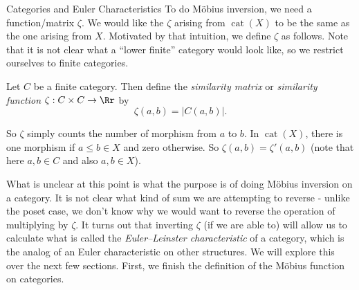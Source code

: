 \documentclass[12pt]{pom_thesis}
\DeclareMathOperator{\cat}{cat}
\begin{document}
\begin{chapter}{Categories and Euler Characteristics}
To do M\"obius inversion, we need a function/matrix $\zeta$. We would like the $\zeta$ arising from $\cat(X)$ to be the same as the one arising from $X$. Motivated by that intuition, we define $\zeta$ as follows. Note that it is not clear what a ``lower finite'' category would look like, so we restrict ourselves to finite categories.

\begin{defn}
Let $C$ be a finite category. Then define the \emph{similarity matrix} or \emph{similarity function} $\zeta : C \times C \rightarrow \Rr$ by 
\[
\zeta(a,b) = |C(a,b)|.
\]
\end{defn}
So $\zeta$ simply counts the number of morphism from $a$ to $b$. In $\cat(X)$, there is one morphism if $a \leq b \in X$ and zero otherwise. So $\zeta(a,b) = \zeta'(a,b)$ (note that here $a,b \in C$ and also $a,b \in X$).

What is unclear at this point is what the purpose is of doing M\"obius inversion on a category. It is not clear what kind of sum we are attempting to reverse - unlike the poset case, we don't know why we would want to reverse the operation of multiplying by $\zeta$. It turns out that inverting $\zeta$ (if we are able to) will allow us to calculate what is called the \emph{Euler--Leinster characteristic} of a category, which is the analog of an Euler characteristic on other structures. We will explore this over the next few sections. First, we finish the definition of the M\"obius function on categories.


\end{chapter}
\end{document}
